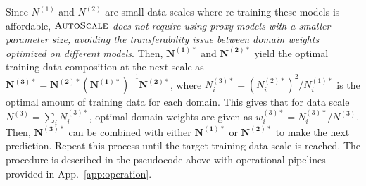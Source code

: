 \documentclass{article} %
\begin{document}
Since $N^{(1)}$ and $N^{(2)}$ are small data scales where re-training these models is affordable, $\textsc{AutoScale}$ \textit{does not require using proxy models with a smaller parameter size, avoiding the transferability issue between domain weights optimized on different models}.
Then, $\mathbf{N^{(1)*}}$ and $\mathbf{N^{(2)*}}$ yield the optimal training data composition at the next scale as
$
\mathbf{N^{(3)*}} = \mathbf{N^{(2)*}}(\mathbf{N^{(1)*}})^{-1}\mathbf{N^{(2)*}}
$,
where $N_i^{(3)*}=(N_i^{(2)*})^2/N_i^{(1)*}$ is the optimal amount of training data for each domain. This gives that for data scale $N^{(3)}=\sum_i N_i^{(3)*}$,
optimal domain weights are given as $w_i^{(3)*}=N_i^{(3)*}/N^{(3)}$. Then, $\mathbf{N^{(3)*}}$ can be combined with either $\mathbf{N^{(1)*}}$ or $\mathbf{N^{(2)*}}$ to make the next prediction. Repeat this process until the target training data scale is reached. The procedure is described in the pseudocode above with operational pipelines provided in App.~\ref{app:operation}.











\end{document}

